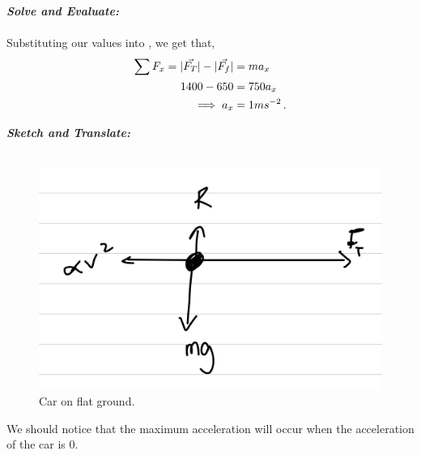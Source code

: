 \begin{subquestions}
\begin{subsubquestions}
\textbf{\textit{Solve and Evaluate:}} \\ \\
Substituting our values into , we get that,
\begin{align}
	\sum F_x = |\vec{F_T}|-|\vec{F_f}| & = ma_x \nonumber \\
	           1400 - 650 & = 750a_x \nonumber \\
	           \implies a_x & = 1 ms^{-2} \,.
\end{align}


\subsubquestion
\textbf{\textit{Sketch and Translate:}} \\ \\
\begin{figure}[H]
	\begin{center}
		\includegraphics[scale=0.25]{../2009/figures/2009q5-2}
		\caption{\label{2009:q5:Sketch3} Car on flat ground.}
	\end{center}
\end{figure}	
We should notice that the maximum acceleration will occur when the acceleration of the car is 0.





\end{subsubquestions}
\end{subquestions}

